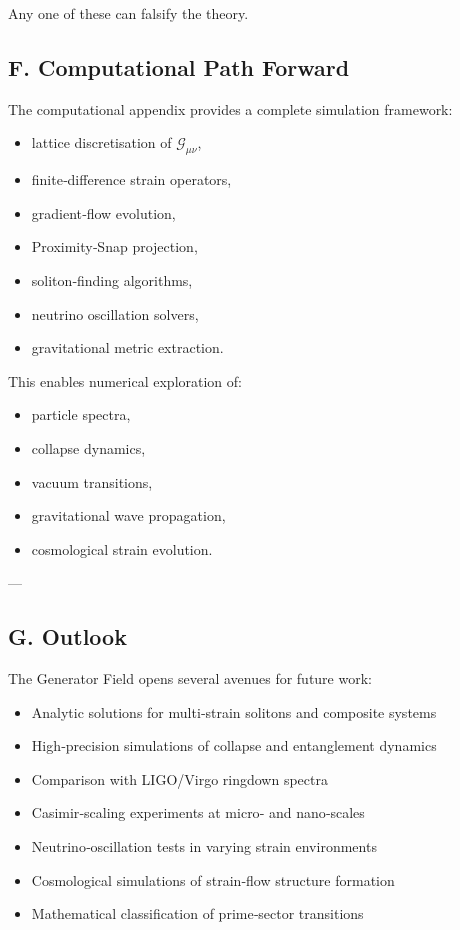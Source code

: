 \documentclass[reprint,amsmath,amssymb,aps,prl,floatfix]{revtex4-2}
\begin{document}
\begin{itemize}
Any one of these can falsify the theory.

\subsection{F. Computational Path Forward}

The computational appendix provides a complete simulation framework:

\begin{itemize}
\item lattice discretisation of \(\mathcal{G}_{\mu\nu}\),  
\item finite‑difference strain operators,  
\item gradient‑flow evolution,  
\item Proximity‑Snap projection,  
\item soliton‑finding algorithms,  
\item neutrino oscillation solvers,  
\item gravitational metric extraction.
\end{itemize}

This enables numerical exploration of:

\begin{itemize}
\item particle spectra,  
\item collapse dynamics,  
\item vacuum transitions,  
\item gravitational wave propagation,  
\item cosmological strain evolution.
\end{itemize}

---

\subsection{G. Outlook}

The Generator Field opens several avenues for future work:

\begin{itemize}
\item Analytic solutions for multi‑strain solitons and composite systems  
\item High‑precision simulations of collapse and entanglement dynamics  
\item Comparison with LIGO/Virgo ringdown spectra  
\item Casimir‑scaling experiments at micro‑ and nano‑scales  
\item Neutrino‑oscillation tests in varying strain environments  
\item Cosmological simulations of strain‑flow structure formation  
\item Mathematical classification of prime‑sector transitions  
\end{itemize}


\end{itemize}
\end{document}
